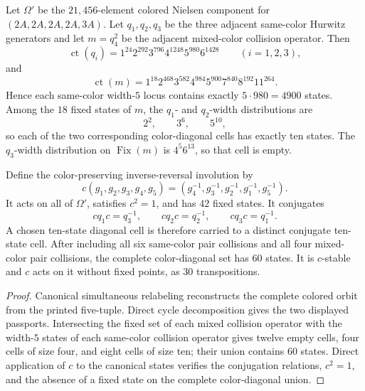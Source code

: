 \begin{proposition}
Let $\Omega'$ be the $21{,}456$-element colored Nielsen component for
$(2A,2A,2A,2A,3A)$.  Let $q_1,q_2,q_3$ be the three adjacent
same-color Hurwitz generators and let $m=q_4^2$ be the adjacent
mixed-color collision operator.  Then
\[
\operatorname{ct}(q_i)=1^{24}2^{292}3^{796}4^{1248}5^{980}6^{1428}
\qquad (i=1,2,3),
\]
and
\[
\operatorname{ct}(m)=1^{18}2^{468}3^{582}4^{984}5^{900}
7^{840}8^{192}11^{264}.
\]
Hence each same-color width-$5$ locus contains exactly
$5\cdot980=4900$ states.  Among the $18$ fixed states of $m$, the
$q_1$- and $q_2$-width distributions are
\[
2^2,\qquad 3^6,\qquad 5^{10},
\]
so each of the two corresponding color-diagonal cells has exactly ten
states.  The $q_3$-width distribution on $\operatorname{Fix}(m)$ is
$4^5 6^{13}$, so that cell is empty.

Define the color-preserving inverse-reversal involution by
\[
c(g_1,g_2,g_3,g_4,g_5)
=(g_4^{-1},g_3^{-1},g_2^{-1},g_1^{-1},g_5^{-1}).
\]
It acts on all of $\Omega'$, satisfies $c^2=1$, and has $42$ fixed
states.  It conjugates
\[
cq_1c=q_3^{-1},\qquad cq_2c=q_2^{-1},\qquad cq_3c=q_1^{-1}.
\]
A chosen ten-state diagonal cell is therefore carried to a distinct
conjugate ten-state cell.  After including all six same-color pair
collisions and all four mixed-color pair collisions, the complete
color-diagonal set has $60$ states.  It is $c$-stable and $c$ acts on
it without fixed points, as $30$ transpositions.
\end{proposition}

\begin{proof}
Canonical simultaneous relabeling reconstructs the complete colored
orbit from the printed five-tuple.  Direct cycle decomposition gives
the two displayed passports.  Intersecting the fixed set of each mixed
collision operator with the width-$5$ states of each same-color
collision operator gives twelve empty cells, four cells of size four,
and eight cells of size ten; their union contains $60$ states.  Direct
application of $c$ to the canonical states verifies the conjugation
relations, $c^2=1$, and the absence of a fixed state on the complete
color-diagonal union.
\end{proof}

